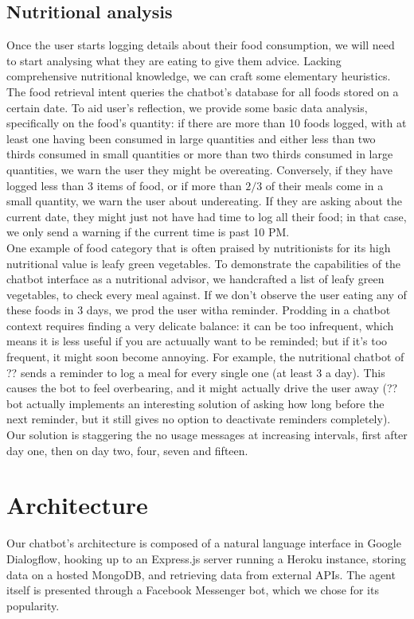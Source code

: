 \subsection{Nutritional analysis}
Once the user starts logging details about their food consumption, we will need to start analysing what they are eating to give them advice. Lacking comprehensive nutritional knowledge, we can craft some elementary heuristics. \\
The food retrieval intent queries the chatbot's database for all foods stored on a certain date. To aid user's reflection, we provide some basic data analysis, specifically on the food's quantity: if there are more than 10 foods logged, with at least one having been consumed in large quantities and either less than two thirds consumed in small quantities or more than two thirds consumed in large quantities, we warn the user they might be overeating. Conversely, if they have logged less than 3 items of food, or if more than $2/3$ of their meals come in a small quantity, we warn the user about undereating. If they are asking about the current date, they might just not have had time to log all their food; in that case, we only send a warning if the current time is past 10 PM.\\
One example of food category that is often praised by nutritionists for its high nutritional value \cite{} is leafy green vegetables. To demonstrate the capabilities of the chatbot interface as a nutritional advisor, we handcrafted a list of leafy green vegetables, to check every meal against. If we don't observe the user eating any of these foods in 3 days, we prod the user witha reminder. Prodding in a chatbot context requires finding a very delicate balance: it can be too infrequent, which means it is less useful if you are actuually want to be reminded; but if it's too frequent, it  might soon become annoying. For example, the nutritional chatbot of ?? \cite{} sends a reminder to log a meal for every single one (at least 3 a day). This causes the bot to feel overbearing, and it might actually drive the user away (??bot actually implements an interesting solution of asking how long before the next reminder, but it still gives no option to deactivate reminders completely). Our solution is staggering the no usage messages at increasing intervals, first after day one, then on day two, four, seven and fifteen.



\section*{Architecture}
Our chatbot's architecture is composed of a natural language interface in Google Dialogflow, hooking up to an Express.js server running a Heroku instance, storing data on a hosted MongoDB, and retrieving data from external APIs. The agent itself is presented through a Facebook Messenger bot, which we chose for its popularity.
